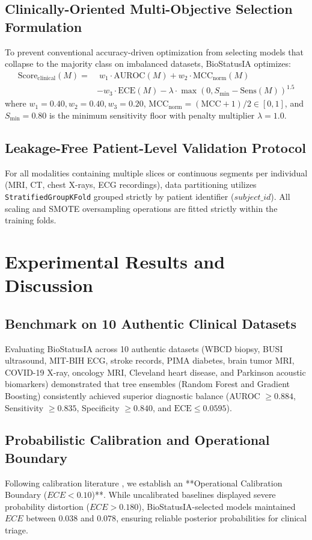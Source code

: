 \documentclass[conference]{IEEEtran}
\begin{document}
\subsection{Clinically-Oriented Multi-Objective Selection Formulation}
To prevent conventional accuracy-driven optimization from selecting models that collapse to the majority class on imbalanced datasets, BioStatusIA optimizes:
\begin{align}
\text{Score}_{\text{clinical}}(M) = & \; w_1 \cdot \text{AUROC}(M) + w_2 \cdot \text{MCC}_{\text{norm}}(M) \nonumber \\
& - w_3 \cdot \text{ECE}(M) - \lambda \cdot \max\left(0, S_{\min} - \text{Sens}(M)\right)^{1.5}
\end{align}
where $w_1 = 0.40, w_2 = 0.40, w_3 = 0.20$, $\text{MCC}_{\text{norm}} = (\text{MCC} + 1)/2 \in [0, 1]$, and $S_{\min} = 0.80$ is the minimum sensitivity floor with penalty multiplier $\lambda = 1.0$.

\subsection{Leakage-Free Patient-Level Validation Protocol}
For all modalities containing multiple slices or continuous segments per individual (MRI, CT, chest X-rays, ECG recordings), data partitioning utilizes \texttt{StratifiedGroupKFold} grouped strictly by patient identifier ($subject\_id$). All scaling and SMOTE oversampling operations are fitted strictly within the training folds.

\section{Experimental Results and Discussion}

\subsection{Benchmark on 10 Authentic Clinical Datasets}
Evaluating BioStatusIA across 10 authentic datasets (WBCD biopsy, BUSI ultrasound, MIT-BIH ECG, stroke records, PIMA diabetes, brain tumor MRI, COVID-19 X-ray, oncology MRI, Cleveland heart disease, and Parkinson acoustic biomarkers) demonstrated that tree ensembles (Random Forest and Gradient Boosting) consistently achieved superior diagnostic balance (AUROC $\ge 0.884$, Sensitivity $\ge 0.835$, Specificity $\ge 0.840$, and $\text{ECE} \le 0.0595$).

\subsection{Probabilistic Calibration and Operational Boundary}
Following calibration literature \cite{guo2017calibration}, we establish an **Operational Calibration Boundary ($ECE < 0.10$)**. While uncalibrated baselines displayed severe probability distortion ($ECE > 0.180$), BioStatusIA-selected models maintained $ECE$ between $0.038$ and $0.078$, ensuring reliable posterior probabilities for clinical triage.
\end{document}
